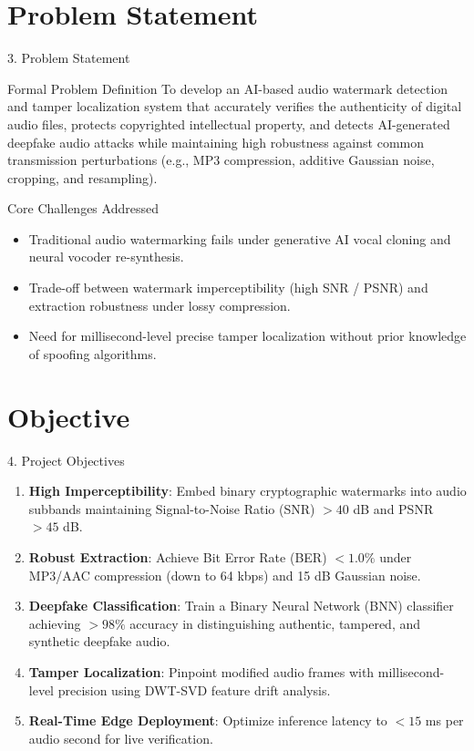 \documentclass[10pt, aspectratio=169]{beamer}
\begin{document}
\section{Problem Statement}
\begin{frame}{3. Problem Statement}
  \begin{block}{Formal Problem Definition}
    To develop an AI-based audio watermark detection and tamper localization system that accurately verifies the authenticity of digital audio files, protects copyrighted intellectual property, and detects AI-generated deepfake audio attacks while maintaining high robustness against common transmission perturbations (e.g., MP3 compression, additive Gaussian noise, cropping, and resampling).
  \end{block}

  \begin{alertblock}{Core Challenges Addressed}
    \begin{itemize}
      \item Traditional audio watermarking fails under generative AI vocal cloning and neural vocoder re-synthesis.
      \item Trade-off between watermark imperceptibility (high SNR / PSNR) and extraction robustness under lossy compression.
      \item Need for millisecond-level precise tamper localization without prior knowledge of spoofing algorithms.
    \end{itemize}
  \end{alertblock}
\end{frame}

\section{Objective}
\begin{frame}{4. Project Objectives}
  \begin{enumerate}
    \item \textbf{High Imperceptibility}: Embed binary cryptographic watermarks into audio subbands maintaining Signal-to-Noise Ratio (SNR) $> 40$ dB and PSNR $> 45$ dB.
    \item \textbf{Robust Extraction}: Achieve Bit Error Rate (BER) $< 1.0\%$ under MP3/AAC compression (down to 64 kbps) and 15 dB Gaussian noise.
    \item \textbf{Deepfake Classification}: Train a Binary Neural Network (BNN) classifier achieving $> 98\%$ accuracy in distinguishing authentic, tampered, and synthetic deepfake audio.
    \item \textbf{Tamper Localization}: Pinpoint modified audio frames with millisecond-level precision using DWT-SVD feature drift analysis.
    \item \textbf{Real-Time Edge Deployment}: Optimize inference latency to $< 15$ ms per audio second for live verification.
  \end{enumerate}
\end{frame}
\end{document}
